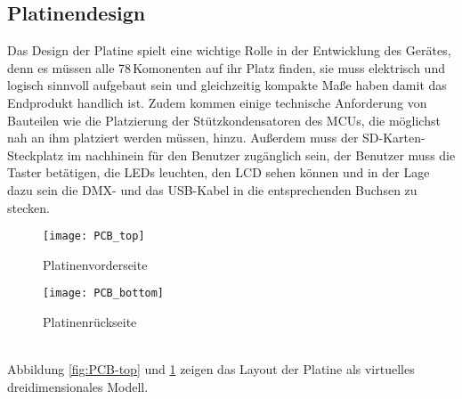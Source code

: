 
\subsection{Platinendesign} \label{sec:PCB-Design}
Das Design der Platine spielt eine wichtige Rolle in der Entwicklung des Gerätes, denn es müssen alle 78\,Komonenten auf ihr Platz finden, sie muss elektrisch und logisch sinnvoll aufgebaut sein und gleichzeitig kompakte Maße haben damit das Endprodukt handlich ist. Zudem kommen einige technische Anforderung von Bauteilen wie die Platzierung der Stützkondensatoren des MCUs, die möglichst nah an ihm platziert werden müssen, hinzu. Außerdem muss der SD-Karten-Steckplatz im nachhinein für den Benutzer zugänglich sein, der Benutzer muss die Taster betätigen, die LEDs leuchten, den LCD sehen können und in der Lage dazu sein die DMX- und das USB-Kabel in die entsprechenden Buchsen zu stecken.
\begin{figure}[h]
	\centering
	\begin{minipage}[t]{0.47\linewidth}
		\centering
		\texttt{[image: PCB\_top]}
		\caption{Platinenvorderseite}
		\label{fig:PCB-top}
	\end{minipage}
	\hfil
	\begin{minipage}[t]{0.47\linewidth}
		\centering
		\texttt{[image: PCB\_bottom]}
		\caption{Platinenrückseite}
		\label{fig:PCB-bottom}
	\end{minipage}
\end{figure}\\
Abbildung \ref{fig:PCB-top} und \ref{fig:PCB-bottom} zeigen das Layout der Platine als virtuelles dreidimensionales Modell. 
